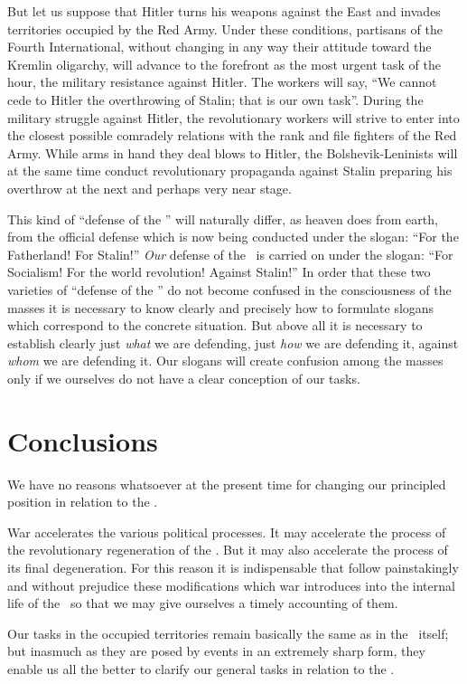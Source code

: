 But let us suppose that Hitler turns his weapons against the East and invades territories occupied by the Red Army. Under these conditions, partisans of the Fourth International, without changing in any way their attitude toward the Kremlin oligarchy, will advance to the forefront as the most urgent task of the hour, the military resistance against Hitler. The workers will say, “We cannot cede to Hitler the overthrowing of Stalin; that is our own task”. During the military struggle against Hitler, the revolutionary workers will strive to enter into the closest possible comradely relations with the rank and file fighters of the Red Army. While arms in hand they deal blows to Hitler, the Bolshevik-Leninists will at the same time conduct revolutionary propaganda against Stalin preparing his overthrow at the next and perhaps very near stage.

This kind of “defense of the \USSR” will naturally differ, as heaven does from earth, from the official defense which is now being conducted under the slogan: “For the Fatherland! For Stalin!” \emph{Our} defense of the \USSR\ is carried on under the slogan: “For Socialism! For the world revolution! Against Stalin!” In order that these two varieties of “defense of the \USSR” do not become confused in the consciousness of the masses it is necessary to know clearly and precisely how to formulate slogans which correspond to the concrete situation. But above all it is necessary to establish clearly just \emph{what} we are defending, just \emph{how} we are defending it, against \emph{whom} we are defending it. Our slogans will create confusion among the masses only if we ourselves do not have a clear conception of our tasks.

\section*{Conclusions}

We have no reasons whatsoever at the present time for changing our principled position in relation to the \USSR.

War accelerates the various political processes. It may accelerate the process of the revolutionary regeneration of the \USSR. But it may also accelerate the process of its final degeneration. For this reason it is indispensable that follow painstakingly and without prejudice these modifications which war introduces into the internal life of the \USSR\ so that we may give ourselves a timely accounting of them.

Our tasks in the occupied territories remain basically the same as in the \USSR\ itself; but inasmuch as they are posed by events in an extremely sharp form, they enable us all the better to clarify our general tasks in relation to the \USSR.

